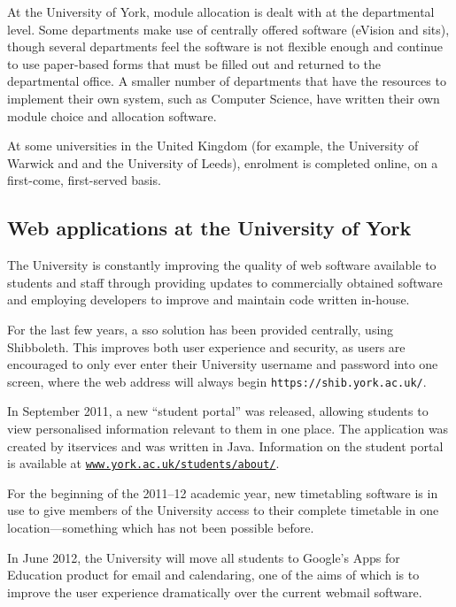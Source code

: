 \documentclass[draft]{scrartcl}
\begin{document}
At the University of York, module allocation is dealt with at the departmental
level. Some departments make use of centrally offered software (eVision and
\gls{sits}), though several departments feel the software is not flexible
enough and continue to use paper-based forms that must be filled out and
returned to the departmental office. A smaller number of departments that have
the resources to implement their own system, such as Computer Science, have
written their own module choice and allocation software.

At some universities in the United Kingdom (for example, the University of
Warwick and and the University of Leeds), enrolment is completed online, on a
first-come, first-served basis.


\subsection{Web applications at the University of York}
\label{sec:webapps_york}


The University is constantly improving the quality of web software available
to students and staff through providing updates to commercially obtained
software and employing developers to improve and maintain code written
in-house.

For the last few years, a \gls{sso} solution has been provided
centrally, using Shibboleth. This improves both user experience and security,
as users are encouraged to only ever enter their University username and
password into one screen, where the web address will always begin
\texttt{https://shib.york.ac.uk/}.

In September 2011, a new ``student portal'' was released, allowing students to
view personalised information relevant to them in one place. The application
was created by \gls{itservices} and was written in Java. Information on the
student portal is available at
\texttt{\href{https://www.york.ac.uk/students/about/}{www.york.ac.uk/students/about/}}.

For the beginning of the 2011--12 academic year, new timetabling software is in
use to give members of the University access to their complete timetable in
one location---something which has not been possible before.

In June 2012, the University will move all students to Google's Apps for
Education product for email and calendaring, one of the aims of which is to
improve the user experience dramatically over the current webmail software.
\end{document}
